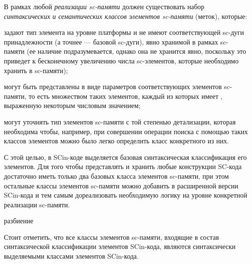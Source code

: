 В рамках любой \textit{реализации sc-памяти} должен существовать набор \textit{синтаксических и семантических классов элементов sc-памяти} (меток), которые:
\begin{textitemize}
    \item задают тип элемента на уровне платформы и не имеют соответствующей sc-дуги принадлежности (а точнее --- базовой sc-дуги), явно хранимой в рамках sc-памяти (ее наличие подразумевается, однако она не хранится явно, поскольку это приведет к бесконечному увеличению числа sc-элементов, которые необходимо хранить в sc-памяти);
    \item могут быть представлены в виде параметров соответствующих элементов sc-памяти, то есть множеством таких элементов, каждый из которых имеет , выраженную некоторым числовым значением;
    \item могут уточнять тип элементов sc-памяти с той степенью детализации, которая необходима чтобы, например, при совершении операции поиска с помощью таких классов элементов можно было легко определить класс конкретного из них.
\end{textitemize}

С этой целью, в SCin-коде выделяется базовая синтаксическая классификация его элементов. Для того чтобы представлять и хранить любые конструкции SC-кода достаточно иметь только два базовых класса элементов sc-памяти, при этом остальные классы элементов sc-памяти можно добавить в расширенной версии SCin-кода и тем самым дореализовать необходимую логику на уровне конкретной реализации sc-памяти.

\begin{SCn}
\begin{scnsubstruct}

\begin{scnrelfromset}{разбиение}
\end{scnrelfromset}

\end{scnsubstruct}
\end{SCn}

Стоит отметить, что все классы элементов sc-памяти, входящие в состав синтаксической классификации элементов SCin-кода, являются синтаксически выделяемыми классами элементов SCin-кода.

